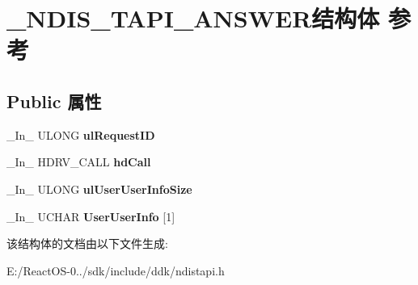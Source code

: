 \hypertarget{struct___n_d_i_s___t_a_p_i___a_n_s_w_e_r}{}\section{\+\_\+\+N\+D\+I\+S\+\_\+\+T\+A\+P\+I\+\_\+\+A\+N\+S\+W\+E\+R结构体 参考}
\label{struct___n_d_i_s___t_a_p_i___a_n_s_w_e_r}
\subsection*{Public 属性}
\begin{DoxyCompactItemize}
\item 
\mbox{\label{struct___n_d_i_s___t_a_p_i___a_n_s_w_e_r_adef0195de0c1591a22096c2428459d53}} 
\+\_\+\+In\+\_\+ U\+L\+O\+NG {\bfseries ul\+Request\+ID}
\item 
\mbox{\label{struct___n_d_i_s___t_a_p_i___a_n_s_w_e_r_a809b24cfaf2d5dba743486bc1e79cc5a}} 
\+\_\+\+In\+\_\+ H\+D\+R\+V\+\_\+\+C\+A\+LL {\bfseries hd\+Call}
\item 
\mbox{\label{struct___n_d_i_s___t_a_p_i___a_n_s_w_e_r_a7cf1cc549ae3aae91d4648b271af4a3c}} 
\+\_\+\+In\+\_\+ U\+L\+O\+NG {\bfseries ul\+User\+User\+Info\+Size}
\item 
\mbox{\label{struct___n_d_i_s___t_a_p_i___a_n_s_w_e_r_a622f3fdb3f7c17b9f32b18b7e251e213}} 
\+\_\+\+In\+\_\+ U\+C\+H\+AR {\bfseries User\+User\+Info} \mbox{[}1\mbox{]}
\end{DoxyCompactItemize}


该结构体的文档由以下文件生成\+:\begin{DoxyCompactItemize}
\item 
E\+:/\+React\+O\+S-\/0../sdk/include/ddk/ndistapi.\+h\end{DoxyCompactItemize}
